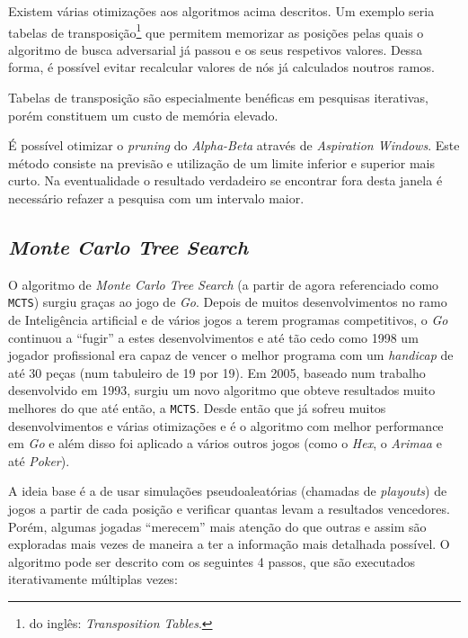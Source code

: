\documentclass[12pt,a4paper,oneside]{article}
\begin{document}
Existem várias otimizações aos algoritmos acima descritos. Um exemplo seria tabelas de transposição\footnote{do inglês: \emph{Transposition Tables}.} que permitem memorizar as posições pelas quais o algoritmo de busca adversarial já passou e os seus respetivos valores. Dessa forma, é possível evitar recalcular valores de nós já calculados noutros ramos.

Tabelas de transposição são especialmente benéficas em pesquisas iterativas, porém constituem um custo de memória elevado.

É possível otimizar o \emph{pruning} do \emph{Alpha-Beta} através de \emph{Aspiration Windows}. Este método consiste na previsão e utilização de um limite inferior e superior mais curto. Na eventualidade o resultado verdadeiro se encontrar fora desta janela é necessário refazer a pesquisa com um intervalo maior.



\subsection{\textit{Monte Carlo Tree Search}}
\label{ssec:mcts}

O algoritmo de \textit{Monte Carlo Tree Search} (a partir de agora
referenciado como \texttt{MCTS}) surgiu graças ao jogo de
\textit{Go}. Depois de muitos desenvolvimentos no ramo de Inteligência
artificial e de vários jogos a terem programas competitivos, o
\textit{Go} continuou a ``fugir'' a estes desenvolvimentos e até tão
cedo como 1998 um jogador profissional era capaz de vencer o melhor
programa com um \textit{handicap} de até 30 peças (num tabuleiro de 19
por 19).  Em 2005, baseado num trabalho desenvolvido em
1993\cite{Brugmann:1993}, surgiu um novo algoritmo que obteve
resultados muito melhores do que até então, a \texttt{MCTS}. Desde
então que já sofreu muitos desenvolvimentos e várias otimizações e é o
algoritmo com melhor performance em \textit{Go} e além disso foi
aplicado a vários outros jogos (como o \textit{Hex}, o \textit{Arimaa}
e até \textit{Poker}).

A ideia base é a de usar simulações pseudoaleatórias (chamadas de
\textit{playouts}) de jogos a partir de cada posição e verificar
quantas levam a resultados vencedores. Porém, algumas jogadas
``merecem'' mais atenção do que outras e assim são exploradas mais
vezes de maneira a ter a informação mais detalhada possível. O
algoritmo pode ser descrito com os seguintes 4 passos, que são
executados iterativamente múltiplas vezes:
\end{document}
